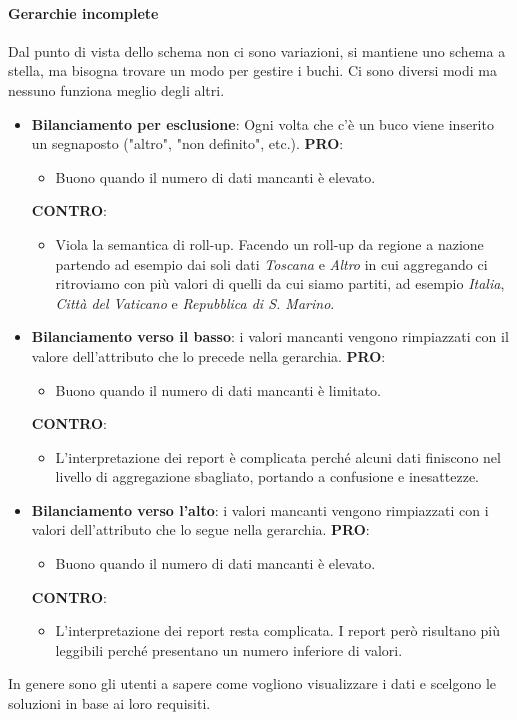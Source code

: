 \paragraph{Gerarchie incomplete}
Dal punto di vista dello schema non ci sono variazioni, si mantiene uno schema a stella, ma bisogna trovare un modo per gestire i buchi. Ci sono diversi modi ma nessuno funziona meglio degli altri.
\begin{itemize}
	\item \textbf{Bilanciamento per esclusione}: Ogni volta che c'è un buco viene inserito un segnaposto ("altro", "non definito", etc.).
	\textbf{PRO}:
	\begin{itemize}
		\item Buono quando il numero di dati mancanti è elevato.
	\end{itemize}
	\textbf{CONTRO}:
	\begin{itemize}
		\item Viola la semantica di roll-up. Facendo un roll-up da regione a nazione partendo ad esempio dai soli dati \textit{Toscana} e \textit{Altro} in cui aggregando ci ritroviamo con più valori di quelli da cui siamo partiti, ad esempio \textit{Italia}, \textit{Città del Vaticano} e \textit{Repubblica di S. Marino}.
	\end{itemize}
	\item \textbf{Bilanciamento verso il basso}: i valori mancanti vengono rimpiazzati con il valore dell'attributo che lo precede nella gerarchia.
	\textbf{PRO}:
	\begin{itemize}
		\item Buono quando il numero di dati mancanti è limitato.
	\end{itemize}
	\textbf{CONTRO}:
	\begin{itemize}
		\item L'interpretazione dei report è complicata perché alcuni dati finiscono nel livello di aggregazione sbagliato, portando a confusione e inesattezze.
	\end{itemize}
	\item \textbf{Bilanciamento verso l'alto}: i valori mancanti vengono rimpiazzati con i valori dell'attributo che lo segue nella gerarchia.
	\textbf{PRO}:
	\begin{itemize}
		\item Buono quando il numero di dati mancanti è elevato.
	\end{itemize}
	\textbf{CONTRO}:
	\begin{itemize}
		\item L'interpretazione dei report resta complicata. I report però risultano più leggibili perché presentano un numero inferiore di valori.
	\end{itemize}
\end{itemize}
In genere sono gli utenti a sapere come vogliono visualizzare i dati e scelgono le soluzioni in base ai loro requisiti.
